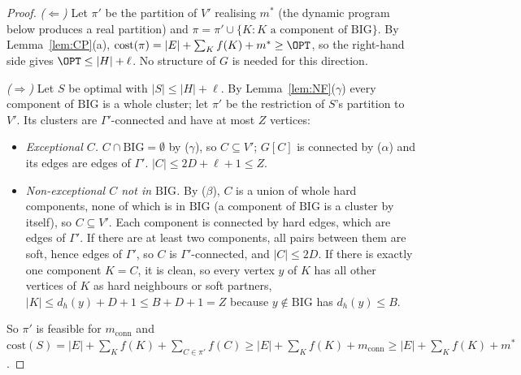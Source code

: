 \begin{proof}
\emph{($\Leftarrow$)} Let $\pi'$ be the partition of $V'$ realising $m^*$ (the dynamic program below produces a real partition) and $\pi=\pi'\cup\{K:K\text{ a component of BIG}\}$. By Lemma~\ref{lem:CP}(a), $\mathrm{cost}(\pi)=|E|+\sum_Kf(K)+m^*\ge\OPT$, so the right-hand side gives $\OPT\le|H|+\ell$. No structure of $G$ is needed for this direction.

\emph{($\Rightarrow$)} Let $S$ be optimal with $|S|\le|H|+\ell$. By Lemma~\ref{lem:NF}($\gamma$) every component of $\mathrm{BIG}$ is a whole cluster; let $\pi'$ be the restriction of $S$'s partition to $V'$. Its clusters are $\Gamma'$-connected and have at most $Z$ vertices:
\begin{itemize}
\item \emph{Exceptional $C$.} $C\cap\mathrm{BIG}=\emptyset$ by ($\gamma$), so $C\subseteq V'$; $G[C]$ is connected by ($\alpha$) and its edges are edges of $\Gamma'$. $|C|\le2D+\ell+1\le Z$.
\item \emph{Non-exceptional $C$ not in $\mathrm{BIG}$.} By ($\beta$), $C$ is a union of whole hard components, none of which is in $\mathrm{BIG}$ (a component of $\mathrm{BIG}$ is a cluster by itself), so $C\subseteq V'$. Each component is connected by hard edges, which are edges of $\Gamma'$. If there are at least two components, all pairs between them are soft, hence edges of $\Gamma'$, so $C$ is $\Gamma'$-connected, and $|C|\le2D$. If there is exactly one component $K=C$, it is clean, so every vertex $y$ of $K$ has all other vertices of $K$ as hard neighbours or soft partners, $|K|\le d_h(y)+D+1\le B+D+1=Z$ because $y\notin\mathrm{BIG}$ has $d_h(y)\le B$.
\end{itemize}
So $\pi'$ is feasible for $m_{\mathrm{conn}}$ and $\mathrm{cost}(S)=|E|+\sum_Kf(K)+\sum_{C\in\pi'}f(C)\ge|E|+\sum_Kf(K)+m_{\mathrm{conn}}\ge|E|+\sum_Kf(K)+m^*$.


\end{proof}
